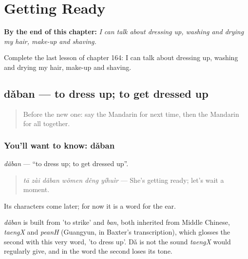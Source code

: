 
\chapter{Getting Ready}
\label{ch:zh-getting-ready}

\begin{chapteropening}
\textbf{By the end of this chapter:} \emph{I can talk about dressing up, washing and drying my hair, make-up and shaving.}

Complete the last lesson of chapter 164: I can talk about dressing up, washing and drying my hair, make-up and shaving.
\end{chapteropening}

\section[dǎban]{dǎban — to dress up; to get dressed up}

\label{lesson:ZH-C164-daban}



\begin{quote}
Before the new one: say the Mandarin for next time, then the Mandarin for all together.
\end{quote}

\subsection*{You'll want to know: dǎban}
\emph{dǎban} — \textquotedblleft{}to dress up; to get dressed up\textquotedblright{}.

\begin{quote}
\emph{tā zài dǎban wǒmen děng yíhuìr} — She's getting ready; let's wait a moment.
\end{quote}

Its characters come later; for now it is a word for the ear.

\begin{cousinweb}
\emph{dǎban} is built from  'to strike' and \emph{ban}, both inherited from Middle Chinese, \emph{taengX} and \emph{peanH} (Guangyun, in Baxter's transcription), which glosses the second with this very word, 'to dress up'. Dǎ is not the sound \emph{taengX} would regularly give, and in the word the second loses its tone.
\end{cousinweb}

